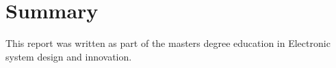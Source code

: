\section*{Summary}

This report was written as part of the masters degree education in Electronic system design and innovation. 